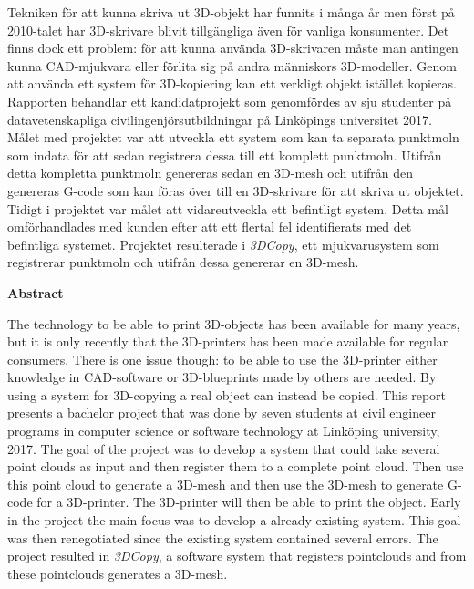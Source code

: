 \noindent
Tekniken för att kunna skriva ut 3D-objekt har funnits i många år men först på 2010-talet har 3D-skrivare blivit tillgängliga även för vanliga konsumenter. Det finns dock ett problem: för att kunna använda 3D-skrivaren måste man antingen kunna CAD-mjukvara eller förlita sig på andra människors 3D-modeller. Genom att använda ett system för 3D-kopiering kan ett verkligt objekt istället kopieras. Rapporten behandlar ett kandidatprojekt som genomfördes av sju studenter på datavetenskapliga civilingenjörsutbildningar på Linköpings universitet 2017. Målet med projektet var att utveckla ett system som kan ta separata punktmoln som indata för att sedan registrera dessa till ett komplett punktmoln. Utifrån detta kompletta punktmoln genereras sedan en 3D-mesh och utifrån den genereras G-code som kan föras över till en 3D-skrivare för att skriva ut objektet. Tidigt i projektet var målet att vidareutveckla ett befintligt system. Detta mål omförhandlades med kunden efter att ett flertal fel identifierats med det befintliga systemet. Projektet resulterade i \textit{3DCopy}, ett mjukvarusystem som registrerar punktmoln och utifrån dessa genererar en 3D-mesh.
\bigskip

\begin{center}
\textbf{Abstract}
\end{center}
\noindent
The technology to be able to print 3D-objects has been available for many years, but it is only recently that the 3D-printers has been made available for regular consumers. There is one issue though: to be able to use the 3D-printer either knowledge in CAD-software or 3D-blueprints made by others are needed. By using a system for 3D-copying a real object can instead be copied. This report presents a bachelor project that was done by seven students at civil engineer programs in computer science or software technology at Linköping university, 2017. The goal of the project was to develop a system that could take several point clouds as input and then register them to a complete point cloud. Then use this point cloud to generate a 3D-mesh and then use the 3D-mesh to generate G-code for a 3D-printer. The 3D-printer will then be able to print the object. Early in the project the main focus was to develop a already existing system. This goal was then renegotiated since the existing system contained several errors. The project resulted in \textit{3DCopy}, a software system that registers pointclouds and from these pointclouds generates a 3D-mesh.

